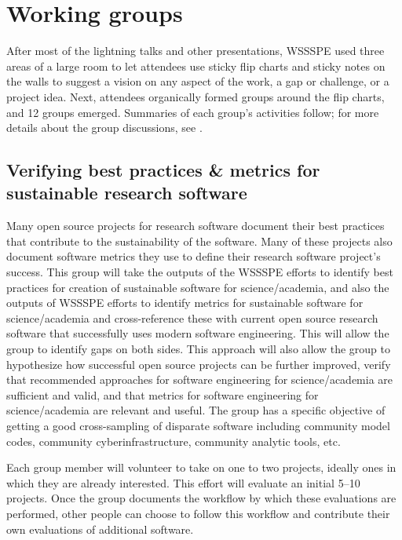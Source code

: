 \documentclass[11pt, oneside]{amsart}
\newcommand{\note}[1]{ {\textcolor{blueish}    { ***Note:      #1 }}}
\begin{document}
\section{Working groups} \label{sec:WGs}

After most of the lightning talks and other presentations, WSSSPE used three areas of a large room to let
attendees use sticky flip charts and sticky notes on the walls to suggest a vision on any aspect of the work, a gap or challenge, or a project idea.
Next, attendees organically formed groups around the flip charts, and 12 groups emerged.
Summaries of each group's activities follow; for more details
about the group discussions, see \cite{WSSSPE4-report}.



\subsection{Verifying best practices \& metrics for sustainable research software}
\label{sec:best-practices-sustainable}


Many open source projects for research software document their best practices that
contribute to the sustainability of the software.  Many of these projects also
document software metrics they use to define their research software project's success.
%
This group will take the outputs of the WSSSPE efforts to identify best practices for creation of sustainable software for science/academia, and also the outputs of WSSSPE efforts to identify metrics for sustainable software for science/academia and cross-reference these with current open source research software that successfully uses modern software engineering.  This will allow the group to identify gaps on both sides.  This approach will also allow the group to hypothesize how successful open source projects can be further improved, verify that recommended approaches for software engineering for science/academia are sufficient and valid, and that metrics for software engineering for science/academia are relevant and useful.  The group has a specific objective of getting a good cross-sampling of disparate software including community model codes, community cyberinfrastructure, community analytic tools, etc.

Each group member will volunteer to take on one to two projects, ideally ones in which they are already interested.  This effort will evaluate an initial 5--10 projects.  Once the group documents the workflow by which these evaluations are performed, other people can choose to follow this workflow and contribute their own evaluations of additional software.
\end{document}
